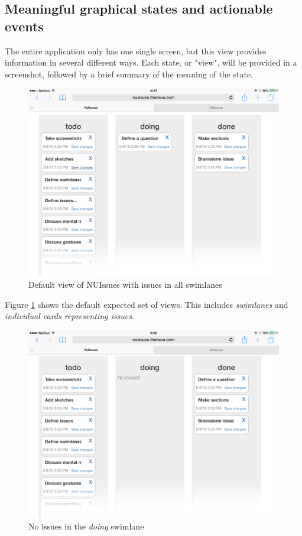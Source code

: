 \subsection{Meaningful graphical states and actionable events}

The entire application only has one single screen, but this view provides information in several different ways. Each state, or "view", will be provided in a screenshot, followed by a brief summary of the meaning of the state.

\begin{figure}[H]
    \centerline{\includegraphics[scale=0.4]{images/nuissues-screenshots/01-default-all-swimlanes}}
    \caption{Default view of NUIssues with issues in all swimlanes}
    \label{figure:meaningful-standard-view}
\end{figure}

Figure \ref{figure:meaningful-standard-view} shows the default expected set of views. This includes \textit{swimlanes} and \textit{individual cards representing issues}.

\begin{figure}[H]
    \centerline{\includegraphics[scale=0.4]{images/nuissues-screenshots/02-default-none-doing}}
    \caption{No issues in the \textit{doing} swimlane}
    \label{figure:meaningful-none-doing}
\end{figure}

